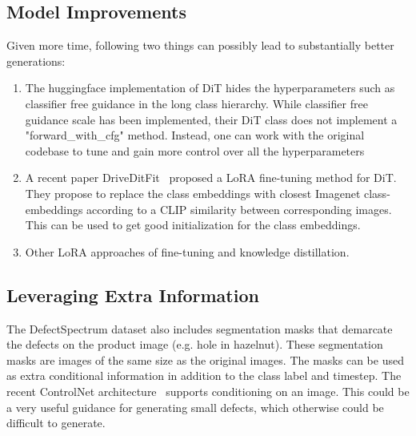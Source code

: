 \documentclass[]{article}
\begin{document}
\subsection{Model Improvements}
Given more time, following two things can possibly lead to substantially better generations:
\begin{enumerate}
	\item The huggingface implementation of DiT hides the hyperparameters such as classifier free guidance in the long class hierarchy. While classifier free guidance scale has been implemented, their DiT class does not implement a "forward\_with\_cfg" method. Instead, one can work with the original codebase to tune and gain more control over all the hyperparameters
	\item A recent paper DriveDitFit~\cite{driveditfit} proposed a LoRA fine-tuning method for DiT. They propose to replace the class embeddings with closest Imagenet class-embeddings according to a CLIP similarity between corresponding images. This can be used to get good initialization for the class embeddings. 
	\item Other LoRA approaches of fine-tuning and knowledge distillation.
\end{enumerate}
\subsection{Leveraging Extra Information}
The DefectSpectrum dataset also includes segmentation masks that demarcate the defects on the product image (e.g. hole in hazelnut). These segmentation masks are images of the same size as the original images. The masks can be used as extra conditional information in addition to the class label and timestep. The recent ControlNet architecture~\cite{controlnet} supports conditioning on an image. This could be a very useful guidance for generating small defects, which otherwise could be difficult to generate. 


\end{document}
